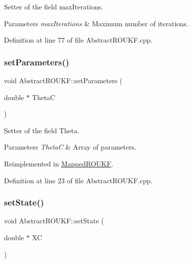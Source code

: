 Setter of the field {\ttfamily max\+Iterations}. 
\begin{DoxyParams}{Parameters}
{\em max\+Iterations} & Maximum number of iterations. \\
\hline
\end{DoxyParams}


Definition at line 77 of file Abstract\+R\+O\+U\+K\+F.\+cpp.

\mbox{\label{classAbstractROUKF_a8e8f7c34007a2363530f7cca4cfb0c9f}} 
\subsubsection{\texorpdfstring{set\+Parameters()}{setParameters()}}
{\footnotesize\ttfamily void Abstract\+R\+O\+U\+K\+F\+::set\+Parameters (\begin{DoxyParamCaption}\item[{double $\ast$}]{ThetaC }\end{DoxyParamCaption})\hspace{0.3cm}{\ttfamily [virtual]}}

Setter of the field {\ttfamily Theta}. 
\begin{DoxyParams}{Parameters}
{\em ThetaC} & Array of parameters. \\
\hline
\end{DoxyParams}


Reimplemented in \mbox{\hyperlink{classMappedROUKF_a4d3a109dc95812c8d9c6ac2a489349c2}{Mapped\+R\+O\+U\+KF}}.



Definition at line 23 of file Abstract\+R\+O\+U\+K\+F.\+cpp.

\mbox{\label{classAbstractROUKF_a618f4719892c0997e5f62cc23913aa12}} 
\subsubsection{\texorpdfstring{set\+State()}{setState()}}
{\footnotesize\ttfamily void Abstract\+R\+O\+U\+K\+F\+::set\+State (\begin{DoxyParamCaption}\item[{double $\ast$}]{XC }\end{DoxyParamCaption})}

